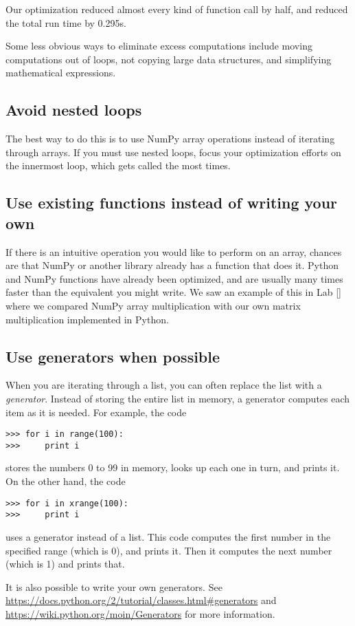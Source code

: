 Our optimization reduced almost every kind of function call by half, and reduced the total run time by 0.295s.

Some less obvious ways to eliminate excess computations include moving computations out of loops, not copying large data structures, and simplifying mathematical expressions.


\subsection*{Avoid nested loops}
The best way to do this is to use NumPy array operations instead of iterating through arrays.
If you must use nested loops, focus your optimization efforts on the innermost loop, which gets called the most times.

\subsection*{Use existing functions instead of writing your own}
If there is an intuitive operation you would like to perform on an array, chances are that NumPy or another library already has a function that does it.
Python and NumPy functions have already been optimized, and are usually many times faster than the equivalent you might write.
We saw an example of this in Lab \ref{} where we compared NumPy array multiplication with our own matrix multiplication implemented in Python.

\subsection*{Use generators when possible}
When you are iterating through a list, you can often replace the list with a \emph{generator}.
Instead of storing the entire list in memory, a generator computes each item as it is needed. 
For example, the code
\begin{lstlisting}
>>> for i in range(100):
>>>     print i
\end{lstlisting}
stores the numbers 0 to 99 in memory, looks up each one in turn, and prints it. 
On the other hand, the code
\begin{lstlisting}
>>> for i in xrange(100):
>>>     print i
\end{lstlisting}
uses a generator instead of a list. 
This code computes the first number in the specified range (which is 0), and prints it.
Then it computes the next number (which is 1) and prints that.

It is also possible to write your own generators. 
See \url{https://docs.python.org/2/tutorial/classes.html#generators} and \url{https://wiki.python.org/moin/Generators} for more information.

